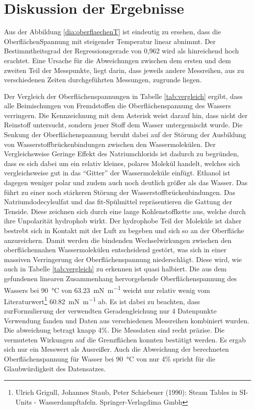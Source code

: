 \section{Diskussion der Ergebnisse}
\label{sec:diskussion}
Aus der Abbildung \ref{dia:oberflaechenT} ist eindeutig zu ersehen, dass die OberflächenSpannung mit steigender Temperatur linear abnimmt. Der Bestimmtheitsgrad der Regressionsgerade von 0,962 wird als hinreichend hoch erachtet. Eine Ursache für die Abweichungen zwischen dem ersten und dem zweiten Teil der Messpunkte, liegt darin, dass jeweils andere Messreihen, aus zu verschiedenen Zeiten durchgeführten Messungen, zugrunde liegen.




Der Vergleich der Oberflächenspannungen in Tabelle \ref{tab:vergleich} ergibt, dass alle Beimischungen von Fremdstoffen die Oberflächenspannung des Wassers verringern. Die Kennzeichnung mit dem Asterisk weist darauf hin, dass nicht der Reinstoff untersucht, sondern jener Stoff dem Wasser untergemischt wurde. Die Senkung der Oberflächenspannung beruht dabei auf der Störung der Ausbildung von Wasserstoffbrückenbindungen zwischen den Wassermolekülen. Der Vergleichsweise Geringe Effekt des Natriumchlorids ist dadurch zu begründen, dass es sich dabei um ein relativ kleines, polares Molekül handelt, welches sich vergleichsweise gut in das "`Gitter"' der Wassermoleküle einfügt. Ethanol ist dagegen weniger polar und zudem auch noch deutlich größer als das Wasser. Das führt zu einer noch stärkeren Störung der Wasserstoffbrückenbindungen. 
Das Natriumdodecylsulfat und das fit-Spülmittel repräsentieren die Gattung der Tenside. Diese zeichnen sich durch eine lange Kohlenstoffkette aus, welche durch ihre Unpolarität hydrophob wirkt. Der hydrophobe Teil der Moleküle ist daher bestrebt sich in Kontakt mit der Luft zu begeben und sich so an der Oberfläche anzureichern. Damit werden die bindenden Wechselwirkungen zwischen den oberflächennahen Wassermolekülen entscheidend gestört, was sich in einer massiven Verringerung der Oberflächenspannung niederschlägt. Diese wird, wie auch in Tabelle \ref{tab:vergleich} zu erkennen ist quasi halbiert.
\vspace{3mm}
Die aus dem gefundenen linearen Zusammenhang hervorgehende Oberflächenspannung des Wassers bei \SI{90}{\degreeCelsius} von \SI{63,23}{\milli\newton\per\meter} weicht nur relativ wenig vom Literaturwert\footnote{Ulrich Grigull, Johannes Staub, Peter Schiebener (1990): Steam Tables in SI-Units - Wasserdampftafeln. Springer-Verlagdima Gmbh } \SI{60,82}{\milli\newton\per\meter} ab. Es ist dabei zu beachten, dass zurFormulierung der verwendten Geradengleichung nur 4 Datenpunkte Verwendung fanden und Daten aus verschiedenen Messreihen kombiniert wurden. Die abweichung betragt knapp 4\%. 
\vspace{3mm}
Die Messdaten sind recht präzise. Die vermuteten Wirkungen auf die Grenzflächen konnten bestätigt werden. Es ergab sich nur ein Messwert als Ausreißer. Auch die Abweichung der berechneten Oberflächenspannung für Wasser bei \SI{90}{\degreeCelsius} von nur 4\% spricht für die Glaubwürdigkeit des Datensatzes.

